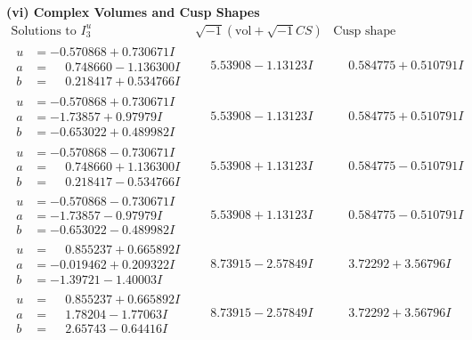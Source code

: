 \documentclass[1p]{elsarticle_modified}
\theoremstyle{definition}
\newcommand{\I}{\sqrt{-1}}
\begin{document}
\newpage\flushleft \textbf{(vi) Complex Volumes and Cusp Shapes}
$$\begin{array}{c|c|c}  
\text{Solutions to }I^u_{3}& \I (\text{vol} + \sqrt{-1}CS) & \text{Cusp shape}\\
 \hline 
\begin{aligned}
u &= -0.570868 + 0.730671 I \\
a &= \phantom{-}0.748660 - 1.136300 I \\
b &= \phantom{-}0.218417 + 0.534766 I\end{aligned}
 & \phantom{-}5.53908 - 1.13123 I & \phantom{-}0.584775 + 0.510791 I \\ \hline\begin{aligned}
u &= -0.570868 + 0.730671 I \\
a &= -1.73857 + 0.97979 I \\
b &= -0.653022 + 0.489982 I\end{aligned}
 & \phantom{-}5.53908 - 1.13123 I & \phantom{-}0.584775 + 0.510791 I \\ \hline\begin{aligned}
u &= -0.570868 - 0.730671 I \\
a &= \phantom{-}0.748660 + 1.136300 I \\
b &= \phantom{-}0.218417 - 0.534766 I\end{aligned}
 & \phantom{-}5.53908 + 1.13123 I & \phantom{-}0.584775 - 0.510791 I \\ \hline\begin{aligned}
u &= -0.570868 - 0.730671 I \\
a &= -1.73857 - 0.97979 I \\
b &= -0.653022 - 0.489982 I\end{aligned}
 & \phantom{-}5.53908 + 1.13123 I & \phantom{-}0.584775 - 0.510791 I \\ \hline\begin{aligned}
u &= \phantom{-}0.855237 + 0.665892 I \\
a &= -0.019462 + 0.209322 I \\
b &= -1.39721 - 1.40003 I\end{aligned}
 & \phantom{-}8.73915 - 2.57849 I & \phantom{-}3.72292 + 3.56796 I \\ \hline\begin{aligned}
u &= \phantom{-}0.855237 + 0.665892 I \\
a &= \phantom{-}1.78204 - 1.77063 I \\
b &= \phantom{-}2.65743 - 0.64416 I\end{aligned}
 & \phantom{-}8.73915 - 2.57849 I & \phantom{-}3.72292 + 3.56796 I \\ \hline\begin{aligned}

\end{aligned}
\end{array}$$
\end{document}

